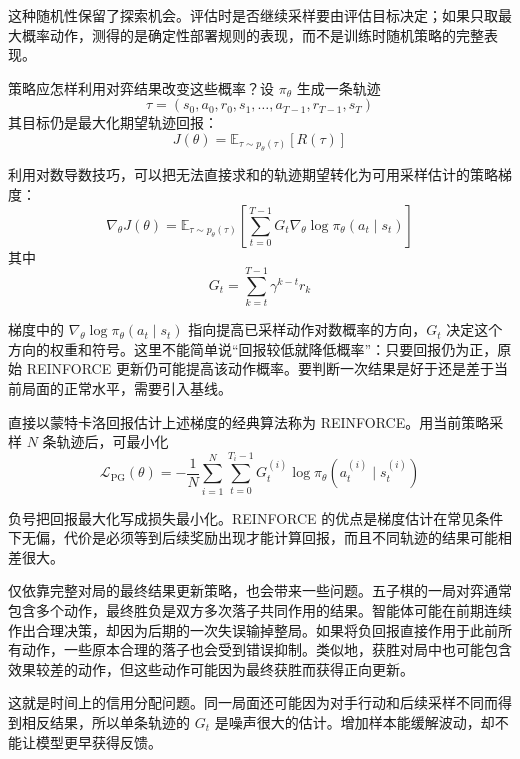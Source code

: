 \documentclass[UTF8,a4paper,zihao=-4,oneside,openany]{ctexbook}
\begin{document}
这种随机性保留了探索机会。评估时是否继续采样要由评估目标决定；如果只取最大概率动作，测得的是确定性部署规则的表现，而不是训练时随机策略的完整表现。

策略应怎样利用对弈结果改变这些概率？设 $\pi_\theta$ 生成一条轨迹
\begin{equation}
\tau
=
(s_0,a_0,r_0,s_1,\ldots,a_{T-1},r_{T-1},s_T)
\end{equation}
其目标仍是最大化期望轨迹回报：
\begin{equation}
J(\theta)
=
\mathbb{E}_{\tau\sim p_{\theta}(\tau)}
\left[
R(\tau)
\right]
\end{equation}

利用对数导数技巧，可以把无法直接求和的轨迹期望转化为可用采样估计的策略梯度：
\begin{equation}
\nabla_{\theta}J(\theta)
=
\mathbb{E}_{\tau\sim p_{\theta}(\tau)}
\left[
\sum_{t=0}^{T-1}
G_t
\nabla_{\theta}
\log\pi_{\theta}(a_t\mid s_t)
\right]
\end{equation}
其中
\begin{equation}
G_t
=
\sum_{k=t}^{T-1}
\gamma^{k-t}r_k
\end{equation}

梯度中的 $\nabla_\theta\log\pi_\theta(a_t\mid s_t)$ 指向提高已采样动作对数概率的方向，$G_t$ 决定这个方向的权重和符号。这里不能简单说“回报较低就降低概率”：只要回报仍为正，原始 REINFORCE 更新仍可能提高该动作概率。要判断一次结果是好于还是差于当前局面的正常水平，需要引入基线。

直接以蒙特卡洛回报估计上述梯度的经典算法称为 REINFORCE。用当前策略采样 $N$ 条轨迹后，可最小化
\begin{equation}
\mathcal{L}_{\mathrm{PG}}(\theta)
=
-
\frac{1}{N}
\sum_{i=1}^{N}
\sum_{t=0}^{T_i-1}
G_t^{(i)}
\log
\pi_{\theta}
\left(
a_t^{(i)}\mid s_t^{(i)}
\right)
\end{equation}

负号把回报最大化写成损失最小化。REINFORCE 的优点是梯度估计在常见条件下无偏，代价是必须等到后续奖励出现才能计算回报，而且不同轨迹的结果可能相差很大。

仅依靠完整对局的最终结果更新策略，也会带来一些问题。五子棋的一局对弈通常包含多个动作，最终胜负是双方多次落子共同作用的结果。智能体可能在前期连续作出合理决策，却因为后期的一次失误输掉整局。如果将负回报直接作用于此前所有动作，一些原本合理的落子也会受到错误抑制。类似地，获胜对局中也可能包含效果较差的动作，但这些动作可能因为最终获胜而获得正向更新。

这就是时间上的信用分配问题。同一局面还可能因为对手行动和后续采样不同而得到相反结果，所以单条轨迹的 $G_t$ 是噪声很大的估计。增加样本能缓解波动，却不能让模型更早获得反馈。
\end{document}
